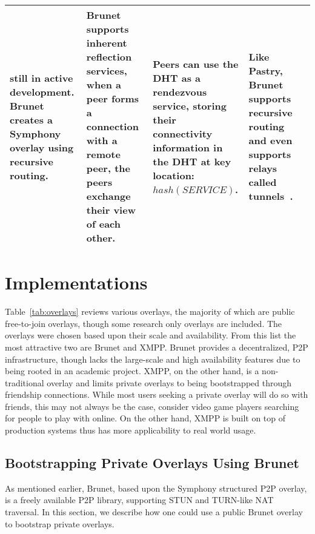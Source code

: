 \documentclass[conference]{IEEEtran}
\begin{document}
\begin{table*}[h!t!]
\begin{tabular}[c]{|m{1.5cm}||m{5.5cm}|m{3cm}|m{3cm}|m{3cm}|}
still in active development.  Brunet creates a Symphony~\cite{symphony} overlay
using recursive routing.
&
Brunet supports inherent reflection services, when a peer forms a connection
with a remote peer, the peers exchange their view of each other.
&
Peers can use the DHT as a rendezvous service, storing their connectivity
information in the DHT at key location:  $hash(SERVICE)$.
&
Like Pastry, Brunet supports recursive routing and even supports relays called
tunnels~\cite{hpdc08_0}.
\\ \hline
\end{tabular}
\caption{}
\label{tab:overlays}
\end{table*}

\section{Implementations}

Table~\ref{tab:overlays} reviews various overlays, the majority of which are
public free-to-join overlays, though some research only overlays are included.
The overlays were chosen based upon their scale and availability.  From this
list the most attractive two are Brunet and XMPP.  Brunet provides a
decentralized, P2P infrastructure, though lacks the large-scale and high
availability features due to being rooted in an academic project.  XMPP, on the
other hand, is a non-traditional overlay and limits private overlays to being
bootstrapped through friendship connections.  While most users seeking a
private overlay will do so with friends, this may not always be the case,
consider video game players searching for people to play with online.  On the
other hand, XMPP is built on top of production systems thus has more
applicability to real world usage.


\subsection{Bootstrapping Private Overlays Using Brunet}
\label{brunet_bootstrapping}

As mentioned earlier, Brunet, based upon the Symphony structured P2P overlay,
is a freely available P2P library, supporting STUN and TURN-like NAT traversal.
In this section, we describe how one could use a public Brunet overlay to
bootstrap private overlays.  
\end{document}
